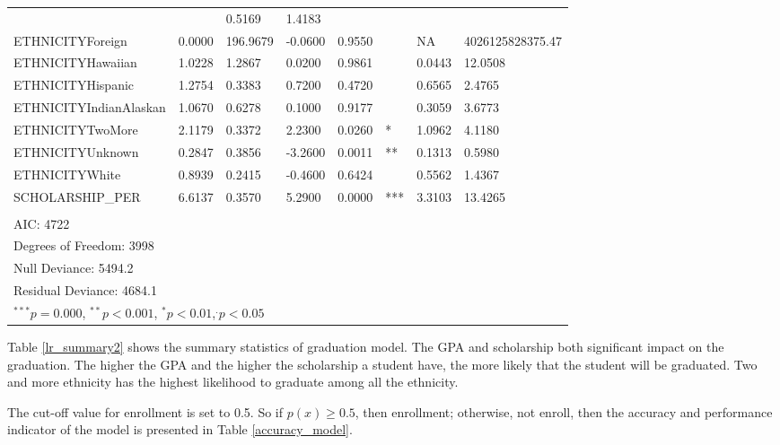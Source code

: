 \documentclass[12pt,english]{report}
\begin{document}
\begin{table}[]
\begin{adjustbox}{width=1.05\textwidth}
\begin{tabular}{llllllll}
&     & 0.5169 & 1.4183             \\
ETHNICITYForeign                & 0.0000   & 196.9679   & -0.0600  & 0.9550    
&     & NA     & 4026125828375.47 \\
ETHNICITYHawaiian               & 1.0228   & 1.2867     & 0.0200   & 0.9861    
&     & 0.0443 & 12.0508            \\
ETHNICITYHispanic               & 1.2754   & 0.3383     & 0.7200   & 0.4720    
&     & 0.6565 & 2.4765             \\
ETHNICITYIndianAlaskan          & 1.0670   & 0.6278     & 0.1000   & 0.9177    
&     & 0.3059 & 3.6773             \\
ETHNICITYTwoMore                & 2.1179   & 0.3372     & 2.2300   & 0.0260    
& *   & 1.0962 & 4.1180             \\
ETHNICITYUnknown                & 0.2847   & 0.3856     & -3.2600  & 0.0011    
& **  & 0.1313 & 0.5980             \\
ETHNICITYWhite                  & 0.8939   & 0.2415     & -0.4600  & 0.6424    
&     & 0.5562 & 1.4367             \\
SCHOLARSHIP\_PER                & 6.6137   & 0.3570     & 5.2900   & 0.0000    
& *** & 3.3103 & 13.4265            \\
\\
AIC: 4722\\
Degrees of Freedom: 3998 \\
Null Deviance:      5494.2 \\
Residual Deviance: 4684.1
\\
\hline
\multicolumn{7}{l}{\scriptsize{$^{***} p=0.000$, $^{**} p<0.001$, $^*
p<0.01$,$^{.}p<0.05$}}

\end{tabular}
\end{adjustbox}
\end{table}

Table \ref{lr_summary2} shows the summary statistics of graduation model. The
GPA and scholarship both significant impact on the graduation. The higher the
GPA and the higher the scholarship a student have, the more likely that the
student will be graduated. Two and more ethnicity has the highest likelihood to
graduate among all the ethnicity. 



The cut-off value for enrollment is set to 0.5. So if  $p(x) \geq 0.5$, then
enrollment;  otherwise, not enroll, then the accuracy and performance indicator
of the model is presented in Table  \ref{accuracy_model}.  
\end{document}
